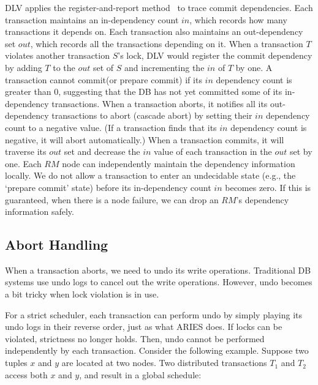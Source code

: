 \documentclass[conference]{IEEEtran}
\begin{document}
DLV applies the register-and-report method~\cite{HeckatonMVCC:journals/pvldb/LarsonBDFPZ11} to trace commit dependencies.
Each transaction maintains an in-dependency count ${in}$, which records how many transactions it depends on.
Each transaction also maintains an out-dependency set  ${out}$, which records all the transactions depending on it.
When a transaction ${T}$ violates another transaction ${S}$'s lock,
DLV would register the commit dependency by adding ${T}$ to the ${out}$ set of ${S}$ and incrementing the ${in}$ of ${T}$ by one.
A transaction cannot commit(or prepare commit) if its ${in}$ dependency count is greater than 0, suggesting that the DB has not yet committed some of its in-dependency transactions.
When a transaction aborts, it notifies all its out-dependency transactions to abort (cascade abort) by setting their ${in}$ dependency count to a negative value.
(If a transaction finds that its ${in}$ dependency count is negative, it will abort automatically.)
When a transaction commits, it will traverse its ${out}$ set and decrease the ${in}$ value of each transaction in the ${out}$ set by one.
Each $RM$ node can independently maintain the dependency information locally.
We do not allow a transaction to enter an undecidable state (e.g., the `prepare commit' state) before its in-dependency count ${in}$ becomes zero.
If this is guaranteed, when there is a node failure, we can drop an $RM$'s dependency information safely.

\subsection{Abort Handling}
When a transaction aborts, we need to undo its write operations.
Traditional DB systems use undo logs to cancel out the write operations.
However, undo becomes a bit tricky when lock violation is in use.

For a strict scheduler, each transaction can perform undo by simply playing its undo logs in their reverse order, just as what ARIES \cite{ARIES:journals/tods/MohanHLPS92} does.
If locks can be violated, strictness no longer holds. 
Then, undo cannot be performed independently by each transaction.
Consider the following example. Suppose two tuples $x$ and $y$ are located at two nodes.
Two distributed transactions $T_1$ and $T_2$ access both $x$ and $y$, and result in a global schedule:
\end{document}

